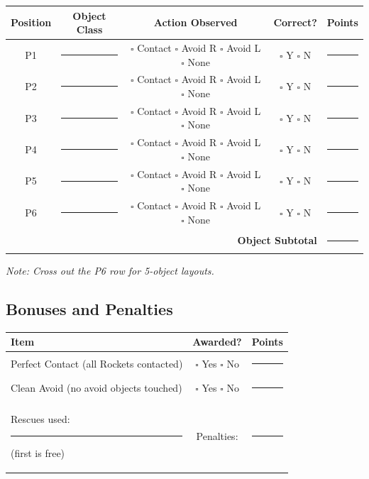 \documentclass[a4]{article}
\begin{document}
\begin{table}[H]
\centering
\begin{tabular}{|c|c|c|c|c|}
\hline
\textbf{Position} & \textbf{Object Class} & \textbf{Action Observed} & \textbf{Correct?} & \textbf{Points} \\
\hline
P1 & \rule{2cm}{0.4pt} & $\square$ Contact \quad $\square$ Avoid R \quad $\square$ Avoid L \quad $\square$ None & $\square$ Y $\square$ N & \rule{1.5cm}{0.4pt} \\
\hline
P2 & \rule{2cm}{0.4pt} & $\square$ Contact \quad $\square$ Avoid R \quad $\square$ Avoid L \quad $\square$ None & $\square$ Y $\square$ N & \rule{1.5cm}{0.4pt} \\
\hline
P3 & \rule{2cm}{0.4pt} & $\square$ Contact \quad $\square$ Avoid R \quad $\square$ Avoid L \quad $\square$ None & $\square$ Y $\square$ N & \rule{1.5cm}{0.4pt} \\
\hline
P4 & \rule{2cm}{0.4pt} & $\square$ Contact \quad $\square$ Avoid R \quad $\square$ Avoid L \quad $\square$ None & $\square$ Y $\square$ N & \rule{1.5cm}{0.4pt} \\
\hline
P5 & \rule{2cm}{0.4pt} & $\square$ Contact \quad $\square$ Avoid R \quad $\square$ Avoid L \quad $\square$ None & $\square$ Y $\square$ N & \rule{1.5cm}{0.4pt} \\
\hline
P6 & \rule{2cm}{0.4pt} & $\square$ Contact \quad $\square$ Avoid R \quad $\square$ Avoid L \quad $\square$ None & $\square$ Y $\square$ N & \rule{1.5cm}{0.4pt} \\
\hline
\multicolumn{4}{|r|}{\textbf{Object Subtotal}} & \rule{1.5cm}{0.4pt} \\
\hline
\end{tabular}
\end{table}

\textit{Note: Cross out the P6 row for 5-object layouts.}

\subsection*{Bonuses and Penalties}

\begin{table}[H]
\centering
\begin{tabular}{|l|c|c|}
\hline
\textbf{Item} & \textbf{Awarded?} & \textbf{Points} \\
\hline
Perfect Contact (all Rockets contacted) & $\square$ Yes \quad $\square$ No & \rule{1.5cm}{0.4pt} \\
\hline
Clean Avoid (no avoid objects touched) & $\square$ Yes \quad $\square$ No & \rule{1.5cm}{0.4pt} \\
\hline
Rescues used: \rule{1cm}{0.4pt} (first is free) & Penalties: & \rule{1.5cm}{0.4pt} \\
\hline
\end{tabular}
\end{table}
\end{document}
